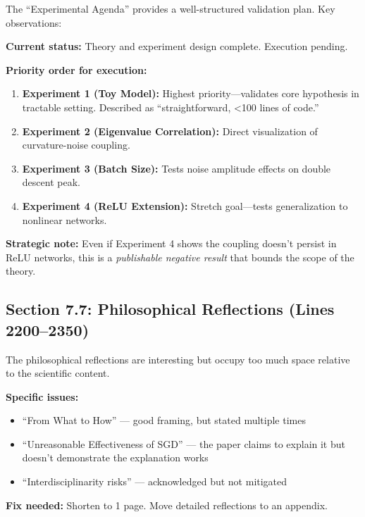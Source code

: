 \documentclass[11pt]{article}
\begin{document}
\begin{insightbox}
The ``Experimental Agenda'' provides a well-structured validation plan. Key observations:

\textbf{Current status:} Theory and experiment design complete. Execution pending.

\textbf{Priority order for execution:}
\begin{enumerate}
    \item \textbf{Experiment 1 (Toy Model):} Highest priority---validates core hypothesis in tractable setting. Described as ``straightforward, <100 lines of code.''
    \item \textbf{Experiment 2 (Eigenvalue Correlation):} Direct visualization of curvature-noise coupling.
    \item \textbf{Experiment 3 (Batch Size):} Tests noise amplitude effects on double descent peak.
    \item \textbf{Experiment 4 (ReLU Extension):} Stretch goal---tests generalization to nonlinear networks.
\end{enumerate}

\textbf{Strategic note:} Even if Experiment 4 shows the coupling doesn't persist in ReLU networks, this is a \textit{publishable negative result} that bounds the scope of the theory.
\end{insightbox}

\subsection{Section 7.7: Philosophical Reflections (Lines 2200--2350)}

\begin{handwavebox}
The philosophical reflections are interesting but occupy too much space relative to the scientific content.

\textbf{Specific issues:}
\begin{itemize}
    \item ``From What to How'' --- good framing, but stated multiple times
    \item ``Unreasonable Effectiveness of SGD'' --- the paper claims to explain it but doesn't demonstrate the explanation works
    \item ``Interdisciplinarity risks'' --- acknowledged but not mitigated
\end{itemize}

\textbf{Fix needed:} Shorten to 1 page. Move detailed reflections to an appendix.
\end{handwavebox}
\end{document}
